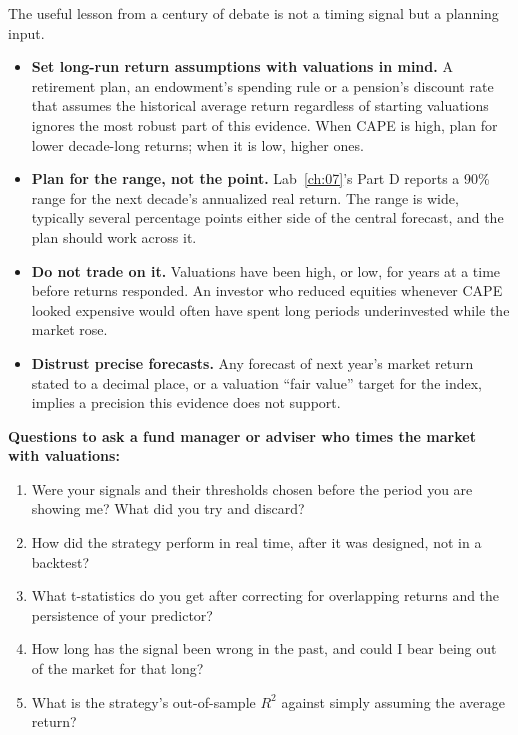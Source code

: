The useful lesson from a century of debate is not a timing signal but a planning input.

\begin{itemize}
  \item \textbf{Set long-run return assumptions with valuations in mind.} A retirement plan, an endowment's spending rule or a pension's discount rate that assumes the historical average return regardless of starting valuations ignores the most robust part of this evidence. When CAPE is high, plan for lower decade-long returns; when it is low, higher ones.
  \item \textbf{Plan for the range, not the point.} Lab~\ref{ch:07}'s Part D reports a 90\% range for the next decade's annualized real return. The range is wide, typically several percentage points either side of the central forecast, and the plan should work across it.
  \item \textbf{Do not trade on it.} Valuations have been high, or low, for years at a time before returns responded. An investor who reduced equities whenever CAPE looked expensive would often have spent long periods underinvested while the market rose.
  \item \textbf{Distrust precise forecasts.} Any forecast of next year's market return stated to a decimal place, or a valuation ``fair value'' target for the index, implies a precision this evidence does not support.
\end{itemize}

\textbf{Questions to ask a fund manager or adviser who times the market with valuations:}

\begin{enumerate}
  \item Were your signals and their thresholds chosen before the period you are showing me? What did you try and discard?
  \item How did the strategy perform in real time, after it was designed, not in a backtest?
  \item What t-statistics do you get after correcting for overlapping returns and the persistence of your predictor?
  \item How long has the signal been wrong in the past, and could I bear being out of the market for that long?
  \item What is the strategy's out-of-sample $R^2$ against simply assuming the average return?
\end{enumerate}

